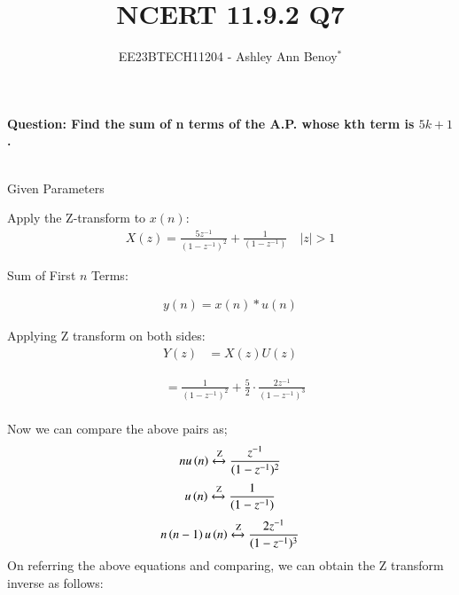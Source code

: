 \documentclass[journal,12pt,twocolumn]{IEEEtran}
\theoremstyle{remark}
\begin{document}
\providecommand{\brak}[1]{\ensuremath{\left(#1\right)}}

\vspace{3cm}

\title{NCERT 11.9.2 Q7}
\author{EE23BTECH11204 - Ashley Ann Benoy$^{*}$}%
\maketitle
\newpage
\bigskip

\textbf{Question: Find the sum of n terms of the A.P. whose kth term is \(5k + 1\).}\\
\solution
\begin{table}[h!]
    \centering
    \resizebox{6cm}{!}{
        
    }
    \\
    \caption{Given Parameters}
    \label{tab:given_params}  
\end{table}

Apply the Z-transform to \( x\brak{n} \):
\begin{align}
X\brak{z} = \frac{5z^{-1}}{\brak{1 - z^{-1}}^2} + \frac{1}{\brak{1 - z^{-1}}}
\quad |z|>1
\end{align}

Sum of First \( n \) Terms:

\begin{align}
y\brak{n} = x\brak{n} * u\brak{n}
\end{align}

Applying Z transform on both sides:
\begin{align}
    Y\brak{z} &= X\brak{z}U\brak{z}
\end{align}

\begin{align}
&=\frac{1}{\brak{1 - z^{-1}}^2} + \frac{5}{2} \cdot \frac{2z^{-1}}{\brak{1 - z^{-1}}^3} 
\end{align}
\\
Now we can compare the  above pairs as;
\begin{align}
nu\brak{n} \xleftrightarrow{\text{Z}} \frac{z^{-1}}{(1 - z^{-1})^2}
\end{align}
\begin{align}
u\brak{n} \xleftrightarrow{\text{Z}} \frac{1}{(1 - z^{-1})}
\end{align}
\begin{align}
n\brak{n-1}u\brak{n} \xleftrightarrow{\text{Z}} \frac{2z^{-1}}{(1 - z^{-1})^3}
\end{align}
On referring the above equations and comparing, we can obtain the  Z transform inverse as follows:
\end{document}

